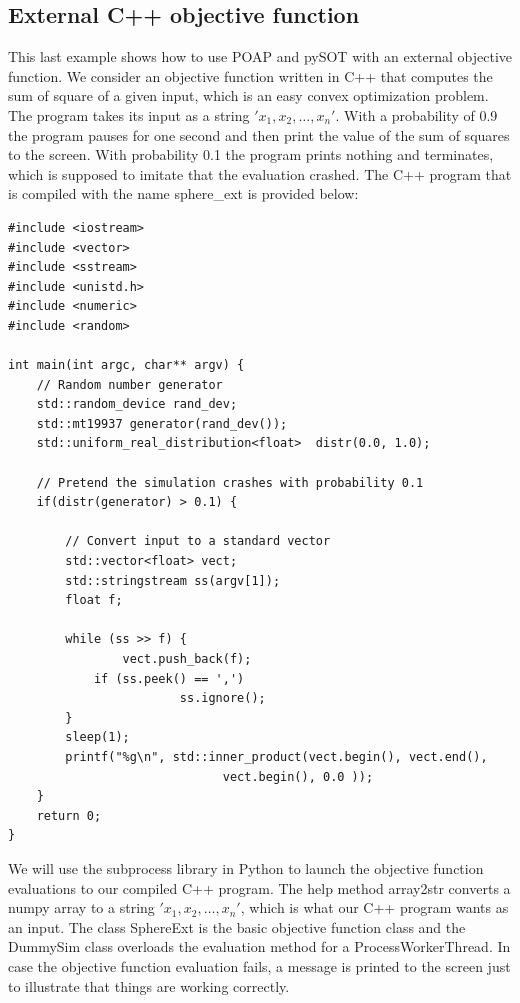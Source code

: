 \documentclass[]{article}
\begin{document}
\subsection{External C++ objective function}
This last example shows how to use POAP and pySOT with an external objective function. We consider an objective function written in C++ that computes the sum of square of a given input, which is an easy convex optimization problem. The program takes its input as a string $'x_1,x_2,\ldots,x_n'$. With a probability of 0.9 the program pauses for one second and then print the value of the sum of squares to the screen. With probability 0.1 the program prints nothing and terminates, which is supposed to imitate that the evaluation crashed. The C++ program that is compiled with the name sphere\_ext is provided below:
\begin{lstlisting}
#include <iostream>
#include <vector>
#include <sstream>
#include <unistd.h>
#include <numeric>
#include <random>

int main(int argc, char** argv) {
	// Random number generator
	std::random_device rand_dev;
	std::mt19937 generator(rand_dev());
	std::uniform_real_distribution<float>  distr(0.0, 1.0);

	// Pretend the simulation crashes with probability 0.1
  	if(distr(generator) > 0.1) {

		// Convert input to a standard vector
		std::vector<float> vect;
		std::stringstream ss(argv[1]);
		float f;

		while (ss >> f) {
    			vect.push_back(f);
			if (ss.peek() == ',')
    	    			ss.ignore();
		}
   	 	sleep(1);    
   		printf("%g\n", std::inner_product(vect.begin(), vect.end(), 
   	 				          vect.begin(), 0.0 ));
	}
	return 0;
}
\end{lstlisting}
We will use the subprocess library in Python to launch the objective function evaluations to our compiled C++ program. The help method array2str converts a numpy array to a string $'x_1,x_2,\ldots,x_n'$, which is what our C++ program wants as an input. The class SphereExt is the basic objective function class and the DummySim class overloads the evaluation method for a ProcessWorkerThread. In case the objective function evaluation fails, a message is printed to the screen just to illustrate that things are working correctly.
\end{document}
